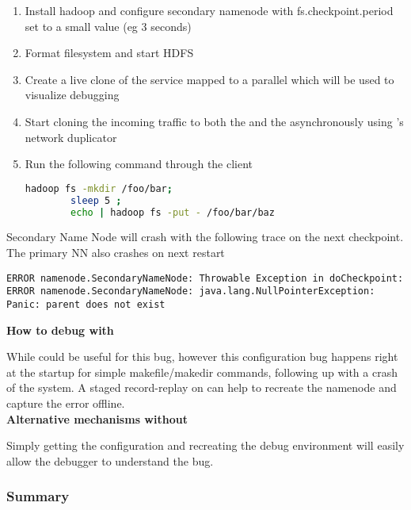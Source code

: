 \begin{adjustwidth}{0.5cm}{}
	\begin{enumerate}
		\item Install hadoop and configure secondary namenode with fs.checkpoint.period set to a small value (eg 3 seconds)
		\item Format filesystem and start HDFS
		\item Create a live clone of the service mapped to a parallel \debugcontainer which will be used to visualize debugging
		\item Start cloning the incoming traffic to both the \productioncontainer and the \debugcontainer asynchronously using \parikshan's network duplicator
		\item Run the following command through the client
		
		\begin{lstlisting}[language=sh]
		hadoop fs -mkdir /foo/bar; 
		sleep 5 ; 
		echo | hadoop fs -put - /foo/bar/baz
		\end{lstlisting}		
	\end{enumerate}

Secondary Name Node will crash with the following trace on the next checkpoint. The primary NN also crashes on next restart

\begin{lstlisting}
ERROR namenode.SecondaryNameNode: Throwable Exception in doCheckpoint:
ERROR namenode.SecondaryNameNode: java.lang.NullPointerException: Panic: parent does not exist
\end{lstlisting}

\end{adjustwidth}

\noindent \textbf{How to debug with \parikshan}

While \parikshan could be useful for this bug, however this configuration bug happens right at the startup for simple makefile/makedir commands, following up with a crash of the system. A staged record-replay on \parikshan can help to recreate the namenode and capture the error offline.\\

\noindent \textbf{Alternative mechanisms without \parikshan}

Simply getting the configuration and recreating the debug environment will easily allow the debugger to understand the bug.

\subsubsection{Summary}

